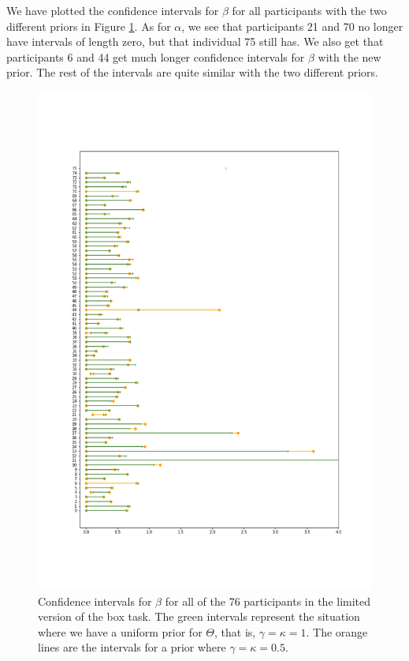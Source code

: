 We have plotted the confidence intervals for $\beta$ for all participants with the two different priors in Figure \ref{fig:sensitivity_ci_lim_beta_zoom}.
As for $\alpha$, we see that participants 21 and 70 no longer have intervals of length zero, but that individual 75 still has. We also get that participants 6 and 44 get much longer confidence intervals for $\beta$ with the new prior. The rest of the intervals are quite similar with the two different priors. 
\begin{figure}
    \centering
    \includegraphics[scale=0.37]{pictures/Sensitivity/ci_lim_beta_zoom1.png}
    \caption[CIs for $\beta$ for all participants with two different priors, limited]{Confidence intervals for $\beta$ for all of the 76 participants in the limited version of the box task. The green intervals represent the situation where we have a uniform prior for $\Theta$, that is, $\gamma=\kappa=1$. The orange lines are the intervals for a prior where $\gamma=\kappa=0.5$.}
    \label{fig:sensitivity_ci_lim_beta_zoom}
\end{figure}

